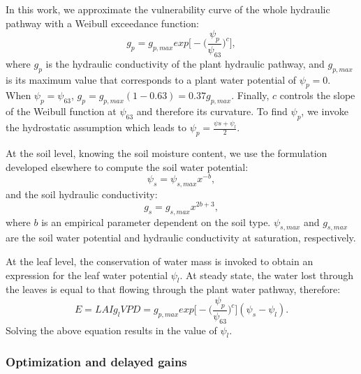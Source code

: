 \documentclass[utf8]{frontiersSCNS} %
\begin{document}
In this work, we approximate the vulnerability curve of the whole hydraulic pathway with a Weibull exceedance function:
\begin{equation}
    \label{eqn:Weibull}
    g_{p} = g_{p,max}exp\Big[-\Big(\frac{\psi_{p}}{\psi_{63}}\Big)^c\Big],
\end{equation}
where $g_{p}$ is the hydraulic conductivity of the plant hydraulic pathway, and $g_{p,max}$ is its maximum value that corresponds to a plant water potential of $\psi_{p}=0$. When $\psi_{p}=\psi_{63}$, $g_{p} = g_{p,max}(1-0.63) = 0.37g_{p,max}$. Finally, $c$ controls the slope of the Weibull function at $\psi_{63}$ and therefore its curvature. To find $\psi_{p}$, we invoke the hydrostatic assumption which leads to $\psi_{p}=\frac{\psi{s}+\psi_l}{2}$.

At the soil level, knowing the soil moisture content, we use the formulation developed elsewhere \citep{Clapp1978} to compute the soil water potential:
\begin{equation}
    \label{eqn:Clapp_psi}
    \psi_s = \psi_{s,max}x^{-b},
\end{equation}
and the soil hydraulic conductivity:
\begin{equation}
    \label{eqn:Clapp_cond}
    g_s = g_{s,max}x^{2b+3},
\end{equation}
where $b$ is an empirical parameter dependent on the soil type. $\psi_{s,max}$ and $g_{s,max}$ are the soil water potential and hydraulic conductivity at saturation, respectively.

At the leaf level, the conservation of water mass is invoked to obtain an expression for the leaf water potential $\psi_{l}$. At steady state, the water lost through the leaves is equal to that flowing through the plant water pathway, therefore:
\begin{equation}
    \label{eqn: mass_cons}
    E = LAI g_l VPD = g_{p,max} exp\Big[-\Big(\frac{\psi_{p}}{\psi_{63}}\Big)^c\Big](\psi_s-\psi_l).
\end{equation}
Solving the above equation results in the value of $\psi_l$.

\subsubsection{Optimization and delayed gains}
\end{document}

